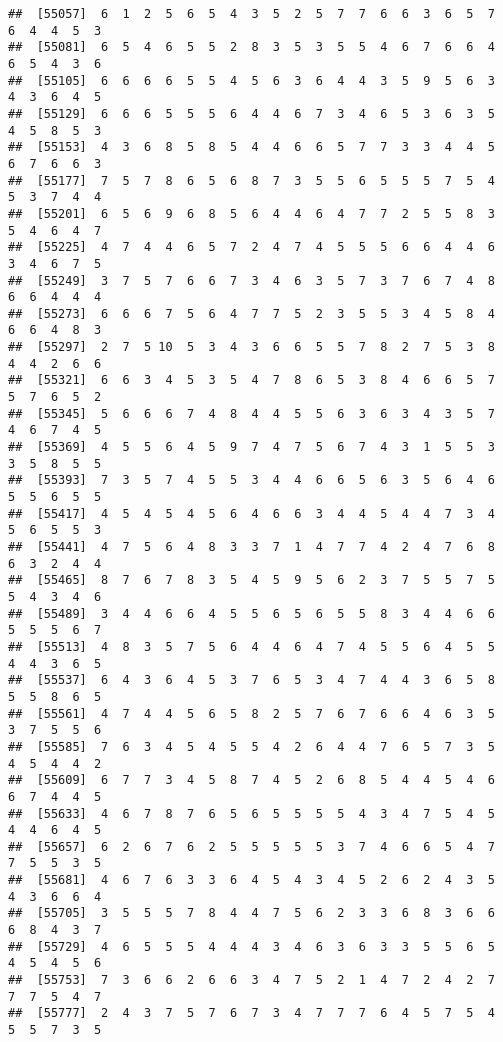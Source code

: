 \documentclass[
]{book}
\begin{document}
\begin{verbatim}
##  [55057]  6  1  2  5  6  5  4  3  5  2  5  7  7  6  6  3  6  5  7  6  4  4  5  3
##  [55081]  6  5  4  6  5  5  2  8  3  5  3  5  5  4  6  7  6  6  4  6  5  4  3  6
##  [55105]  6  6  6  6  5  5  4  5  6  3  6  4  4  3  5  9  5  6  3  4  3  6  4  5
##  [55129]  6  6  6  5  5  5  6  4  4  6  7  3  4  6  5  3  6  3  5  4  5  8  5  3
##  [55153]  4  3  6  8  5  8  5  4  4  6  6  5  7  7  3  3  4  4  5  6  7  6  6  3
##  [55177]  7  5  7  8  6  5  6  8  7  3  5  5  6  5  5  5  7  5  4  5  3  7  4  4
##  [55201]  6  5  6  9  6  8  5  6  4  4  6  4  7  7  2  5  5  8  3  5  4  6  4  7
##  [55225]  4  7  4  4  6  5  7  2  4  7  4  5  5  5  6  6  4  4  6  3  4  6  7  5
##  [55249]  3  7  5  7  6  6  7  3  4  6  3  5  7  3  7  6  7  4  8  6  6  4  4  4
##  [55273]  6  6  6  7  5  6  4  7  7  5  2  3  5  5  3  4  5  8  4  6  6  4  8  3
##  [55297]  2  7  5 10  5  3  4  3  6  6  5  5  7  8  2  7  5  3  8  4  4  2  6  6
##  [55321]  6  6  3  4  5  3  5  4  7  8  6  5  3  8  4  6  6  5  7  5  7  6  5  2
##  [55345]  5  6  6  6  7  4  8  4  4  5  5  6  3  6  3  4  3  5  7  4  6  7  4  5
##  [55369]  4  5  5  6  4  5  9  7  4  7  5  6  7  4  3  1  5  5  3  3  5  8  5  5
##  [55393]  7  3  5  7  4  5  5  3  4  4  6  6  5  6  3  5  6  4  6  5  5  6  5  5
##  [55417]  4  5  4  5  4  5  6  4  6  6  3  4  4  5  4  4  7  3  4  5  6  5  5  3
##  [55441]  4  7  5  6  4  8  3  3  7  1  4  7  7  4  2  4  7  6  8  6  3  2  4  4
##  [55465]  8  7  6  7  8  3  5  4  5  9  5  6  2  3  7  5  5  7  5  5  4  3  4  6
##  [55489]  3  4  4  6  6  4  5  5  6  5  6  5  5  8  3  4  4  6  6  5  5  5  6  7
##  [55513]  4  8  3  5  7  5  6  4  4  6  4  7  4  5  5  6  4  5  5  4  4  3  6  5
##  [55537]  6  4  3  6  4  5  3  7  6  5  3  4  7  4  4  3  6  5  8  5  5  8  6  5
##  [55561]  4  7  4  4  5  6  5  8  2  5  7  6  7  6  6  4  6  3  5  3  7  5  5  6
##  [55585]  7  6  3  4  5  4  5  5  4  2  6  4  4  7  6  5  7  3  5  4  5  4  4  2
##  [55609]  6  7  7  3  4  5  8  7  4  5  2  6  8  5  4  4  5  4  6  6  7  4  4  5
##  [55633]  4  6  7  8  7  6  5  6  5  5  5  5  4  3  4  7  5  4  5  4  4  6  4  5
##  [55657]  6  2  6  7  6  2  5  5  5  5  5  3  7  4  6  6  5  4  7  7  5  5  3  5
##  [55681]  4  6  7  6  3  3  6  4  5  4  3  4  5  2  6  2  4  3  5  4  3  6  6  4
##  [55705]  3  5  5  5  7  8  4  4  7  5  6  2  3  3  6  8  3  6  6  6  8  4  3  7
##  [55729]  4  6  5  5  5  4  4  4  3  4  6  3  6  3  3  5  5  6  5  4  5  4  5  6
##  [55753]  7  3  6  6  2  6  6  3  4  7  5  2  1  4  7  2  4  2  7  7  7  5  4  7
##  [55777]  2  4  3  7  5  7  6  7  3  4  7  7  7  6  4  5  7  5  4  5  5  7  3  5

\end{verbatim}
\end{document}
